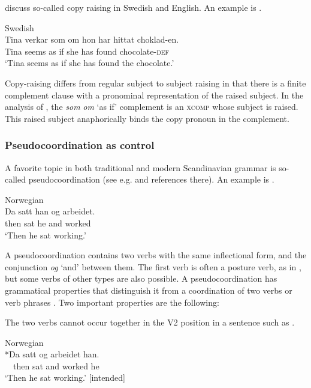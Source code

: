 \documentclass[output=paper,hidelinks]{langscibook}
\begin{document}
\citet{AshT:12} discuss so-called copy raising in Swedish and English. An example is .



\ea\label{ex:Scandinavian:67} Swedish \citep[323]{AshT:12}\\
\gll
 {Tina} {verkar} {som} {om} {hon} {har} {hittat} {choklad-en.}\\
 Tina seems as if she has found chocolate-\textsc{def}\\
\glt `Tina seems as if she has found the chocolate.'\z

\noindent Copy-raising differs from regular subject to subject raising in that there is a finite complement clause with a pronominal representation of the raised subject. In the analysis of \citet{AshT:12}, the \textit{som} \textit{om} `as if' complement is an \textsc{xcomp} whose subject is raised. This raised subject anaphorically binds the copy pronoun in the complement.

\subsubsection{Pseudocoordination as control}

A favorite topic in both traditional and modern Scandinavian grammar is so-called pseudocoordination (see e.g. \citealt{Lodrup19} and references there). An example is .



\ea\label{ex:Scandinavian:68} Norwegian\\
\gll
 {Da} {satt} {han} {og} {arbeidet}\textsc{.}\\
 then sat he and worked \\
\glt `Then he sat working.'\z

\noindent A pseudocoordination contains two verbs with the same inflectional form, and the conjunction \textit{og} `and' between them. The first verb is often a posture verb, as in , but some verbs of other types are also possible. A pseudocoordination has grammatical properties that distinguish it from a coordination of two verbs or verb phrases \citep{Lodrup19}. Two important properties are the following:

The two verbs cannot occur together in the V2 position in a sentence such as .

\ea\label{ex:Scandinavian:69} Norwegian\\
\gll
 {*Da} {satt} {og} {arbeidet} {han.}\\
 ~~then sat and worked he\\
\glt `Then he sat working.' [intended]\z
\end{document}
